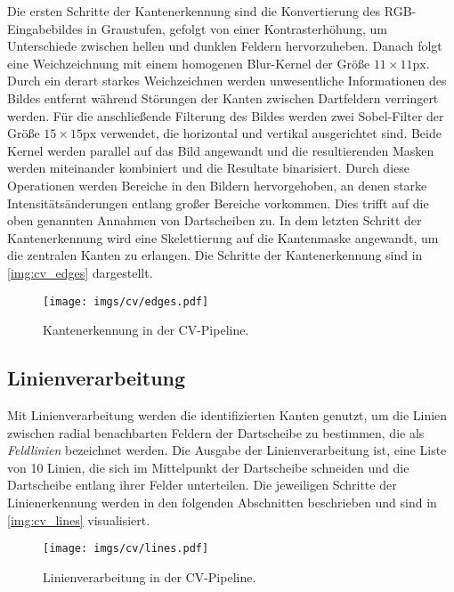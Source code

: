 Die ersten Schritte der Kantenerkennung sind die Konvertierung des RGB-Eingabebildes in Graustufen, gefolgt von einer Kontrasterhöhung, um Unterschiede zwischen hellen und dunklen Feldern hervorzuheben. Danach folgt eine Weichzeichnung mit einem homogenen Blur-Kernel der Größe $11\times11\text{px}$. Durch ein derart starkes Weichzeichnen werden unwesentliche Informationen des Bildes entfernt während Störungen der Kanten zwischen Dartfeldern verringert werden. Für die anschließende Filterung des Bildes werden zwei Sobel-Filter der Größe $15\times15\text{px}$ verwendet, die horizontal und vertikal ausgerichtet sind. Beide Kernel werden parallel auf das Bild angewandt und die resultierenden Masken werden miteinander kombiniert und die Resultate binarisiert. Durch diese Operationen werden Bereiche in den Bildern hervorgehoben, an denen starke Intensitätsänderungen entlang großer Bereiche vorkommen. Dies trifft auf die oben genannten Annahmen von Dartscheiben zu. In dem letzten Schritt der Kantenerkennung wird eine Skelettierung auf die Kantenmaske angewandt, um die zentralen Kanten zu erlangen. Die Schritte der Kantenerkennung sind in \autoref{img:cv_edges} dargestellt.

\begin{figure}
    \centering
    \texttt{[image: imgs/cv/edges.pdf]}
    \caption{Kantenerkennung in der CV-Pipeline.}
    \label{img:cv_edges}
\end{figure}

\subsection{Linienverarbeitung}
\label{sec:impl:cv:lines}

Mit Linienverarbeitung werden die identifizierten Kanten genutzt, um die Linien zwischen radial benachbarten Feldern der Dartscheibe zu bestimmen, die als \textit{Feldlinien} bezeichnet werden. Die Ausgabe der Linienverarbeitung ist, eine Liste von 10 Linien, die sich im Mittelpunkt der Dartscheibe schneiden und die Dartscheibe entlang ihrer Felder unterteilen. Die jeweiligen Schritte der Linienerkennung werden in den folgenden Abschnitten beschrieben und sind in \autoref{img:cv_lines} visualisiert.

\begin{figure}
    \centering
    \texttt{[image: imgs/cv/lines.pdf]}
    \caption{Linienverarbeitung in der CV-Pipeline.}
    \label{img:cv_lines}
\end{figure}

